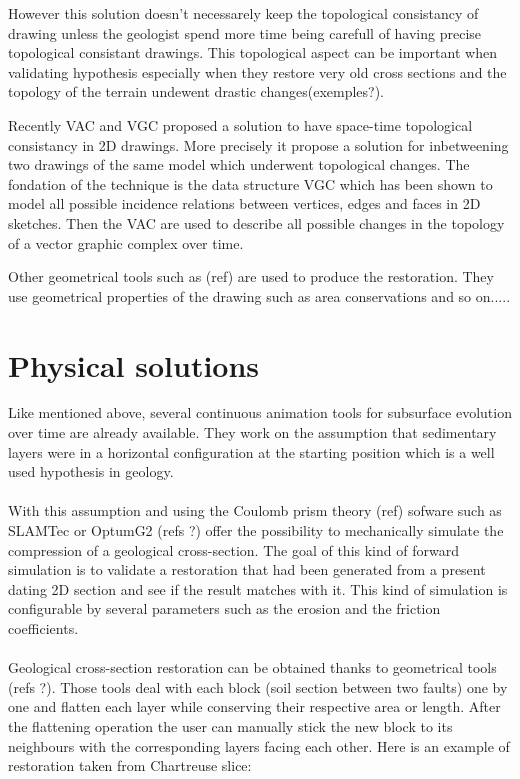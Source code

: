 \documentclass[12pt, a4paper]{memoir} %
\begin{document}
However this solution doesn't necessarely keep the topological consistancy of drawing unless the geologist spend more time being carefull of having precise topological consistant drawings. This topological aspect can be important when validating hypothesis especially when they restore very old cross sections and the topology of the terrain undewent drastic changes(exemples?).

Recently VAC and VGC proposed a solution to have space-time topological consistancy in 2D drawings. More precisely it propose a solution for inbetweening two drawings of the same model which underwent topological changes. The fondation of the technique is the data structure VGC which has been shown to model all possible incidence relations between vertices, edges and faces in 2D sketches. Then the VAC are used to describe all possible changes in the topology of a vector graphic complex over time.

Other geometrical tools such as (ref) are used  to produce the restoration. They use geometrical properties of the drawing such as area conservations and so on.....

\section{Physical solutions}

Like mentioned above, several continuous animation tools for subsurface evolution over time are already available. They work on the assumption that sedimentary layers were in a horizontal configuration at the starting position which is a well used hypothesis in geology. \\\\

With this assumption and using the Coulomb prism theory (ref) sofware such as SLAMTec or OptumG2 (refs ?) offer the possibility to mechanically simulate the compression of a geological cross-section.
The goal of this kind of forward simulation is to validate a restoration that had been generated from a present dating 2D section and see if the result matches with it. This kind of simulation is configurable by several parameters such as the erosion and the friction coefficients.\\\\

Geological cross-section restoration can be obtained thanks to geometrical tools (refs ?). Those tools deal with each block (soil section between two faults) one by one and flatten each layer while conserving their respective area or length. After the flattening operation the user can manually stick the new block to its neighbours with the corresponding layers facing each other. Here is an example of restoration taken from Chartreuse slice:
\\
\end{document}
